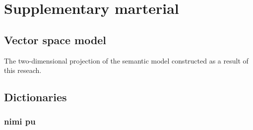\documentclass[14pt, a4paper]{extreport}
\begin{document}
\printbibliography[heading=bibintoc,title={References}]


\chapter{Supplementary marterial}

\section{Vector space model}

The two-dimensional projection of the semantic model constructed as a result of this reseach.


\section{Dictionaries}

\subsection{nimi pu}
\end{document}
